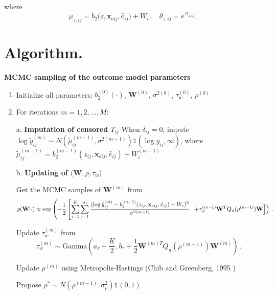 \documentclass[aoas]{imsart}
\theoremstyle{plain}
\theoremstyle{definition}
\begin{document}
where 
\[
\mu_{z,ij} = b_2\bigl(z,\mathbf{x}_{oij},\hat e_{ij}\bigr) + W_i,
\quad
\theta_{z,ij} = e^{\,\mu_{z,ij}}.
\]


\section{Algorithm.}


\noindent \textbf{ MCMC sampling of the outcome model parameters}

\begin{enumerate}
\item Initialize all parameters: $b_2^{(0)}(\cdot)$, $\mathbf{W}^{(0)}$, $\sigma^{2(0)}$, $\tau_w^{(0)}$, $\rho^{(0)}$
   
\item For iterations $m = 1, 2, ..., M$:

\noindent a. \textbf{Imputation of censored $T_{ij}$}
When $\delta_{ij} = 0$, impute 
 $
      \log \tilde{y}_{ij}^{(m)} \sim N(\tilde{\mu}_{ij}^{(m-1)}, \sigma^{2(m-1)}) \mathds{1}( \log y_{ij}, \infty)
      $, where $\tilde{\mu}_{ij}^{(m-1)} = b_2^{(m-1)}(z_{ij}, \mathbf{x}_{oij}, \hat{e}_{ij}) + W_i^{(m-1)}$
   
\noindent b. \textbf{Updating of $(\mathbf{W},\rho,\tau_w$})
      
      Get the MCMC samples of $\mathbf{W}^{(m)}$ from
      \begin{equation}
     p(\mathbf{W} | \cdot) \propto \exp\left(-\frac{1}{2}\left[\sum_{i=1}^K\sum_{j=1}^{n_i} \frac{(\log \tilde{y}_{ij}^{(m)} - b_2^{(m-1)}(z_{ij}, \mathbf{x}_{oij}, \hat{e}_{ij}) - W_i)^2}{\sigma^{2(m-1)}} \right.\right. \\
\left.\left. + \tau_w^{(m-1)} \mathbf{W}^T Q_\pi(\rho^{(m-1)}) \mathbf{W}\right]\right) \nonumber
      \hspace{2pt}. \end{equation}
      
      Update $\tau_w^{(m)}$ from
      \begin{equation}
      \tau_w^{(m)} \sim \text{Gamma}\left(a_\tau + \frac{K}{2}, b_\tau + \frac{1}{2}\mathbf{W}^{(m)T}Q_\pi(\rho^{(m-1)})\mathbf{W}^{(m)}\right) \nonumber
      \hspace{2pt}. \end{equation}
      
      Update $\rho^{(m)}$ using Metropolis-Hastings (Chib and Greenberg, 1995 \parencite{chib1995understanding})
      
      Propose $\rho^* \sim N(\rho^{(m-1)}, \sigma_\rho^2) \mathds{1}(0, 1)$
      

\end{enumerate}
\end{document}
